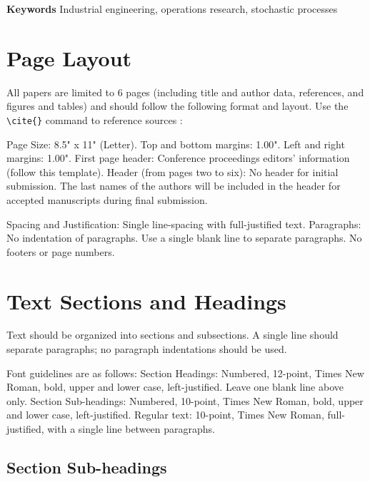 \documentclass[10pt]{article}
\begin{document}
{\fontsize{12}{14}\bfseries\selectfont Keywords}\newline
{\fontsize{10}{12}\selectfont
Industrial engineering, operations research, stochastic processes
}


\section{Page Layout}

All papers are limited to 6 pages (including title and author data, references, and figures and tables) and should follow the following format and layout. Use the \verb|\cite{}| command to reference sources \cite{chang2006}:

Page Size: 8.5" x 11" (Letter). Top and bottom margins: 1.00". Left and right margins: 1.00". First page header: Conference proceedings editors' information (follow this template). Header (from pages two to six): No header for initial submission. The last names of the authors will be included in the header for accepted manuscripts during final submission.

Spacing and Justification: Single line-spacing with full-justified text. Paragraphs: No indentation of paragraphs. Use a single blank line to separate paragraphs. No footers or page numbers.

\section{Text Sections and Headings}

Text should be organized into sections and subsections. A single line should separate paragraphs; no paragraph indentations should be used.

Font guidelines are as follows: Section Headings: Numbered, 12-point, Times New Roman, bold, upper and lower case, left-justified. Leave one blank line above only. Section Sub-headings: Numbered, 10-point, Times New Roman, bold, upper and lower case, left-justified. Regular text: 10-point, Times New Roman, full-justified, with a single line between paragraphs.

\subsection{Section Sub-headings}
\end{document}
